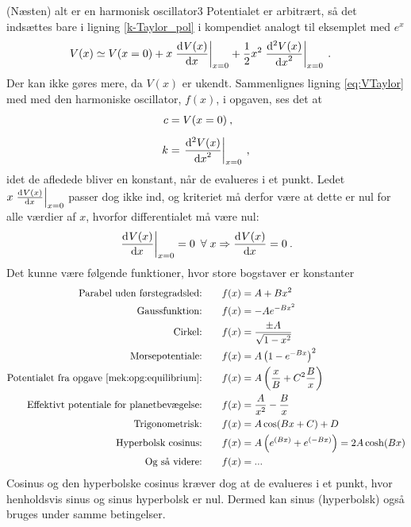 \begin{opgave}{(Næsten) alt er en harmonisk oscillator}{3}
\opg Potentialet er arbitrært, så det indsættes bare i ligning \eqref{k-Taylor_pol} i kompendiet analogt til eksemplet med $e^x$
\begin{align} \label{eq:VTaylor}
	V(x) \simeq V(x=0) &+ x\left.\dif{x}{V(x)}\right|_{x=0} + \frac{1}{2}x^2\left.\dif[2]{x}{V(x)}\right|_{x=0} \: .
\end{align}
Der kan ikke gøres mere, da $V(x)$ er ukendt.
\opg Sammenlignes ligning \eqref{eq:VTaylor} med med den harmoniske oscillator, $f(x)$, i opgaven, ses det at
\begin{align*}
	c &= V(x=0) \: , \\[.5em]
	k &= \left.\dif[2]{x}{V(x)}\right|_{x=0} \: ,
\end{align*}
idet de afledede bliver en konstant, når de evalueres i et punkt. Ledet $x\left.\dif{x}{V(x)}\right|_{x=0}$ passer dog ikke ind, og kriteriet må derfor være at dette er nul for alle værdier af $x$, hvorfor differentialet må være nul:
\begin{align*}
	\left.\dif{x}{V(x)}\right|_{x=0} = 0 \enspace\forall \; x \Rightarrow \dif{x}{V(x)} = 0 \: .
\end{align*}
\opg Det kunne være følgende funktioner, hvor store bogstaver er konstanter
\begingroup
\allowdisplaybreaks
\begin{align*}
	\text{Parabel uden førstegradsled:} \qquad
	&f(x) = A + Bx^2 \\
	\text{Gaussfunktion:} \qquad
	&f(x) = -Ae^{-Bx^2}\\
	\text{Cirkel:} \qquad
	&f(x) = \frac{\pm A}{\sqrt{1-x^2}}\\
	\text{Morsepotentiale:} \qquad
	&f(x) = A\left(1-e^{-Bx}\right)^2\\
	\text{Potentialet fra opgave \ref{mek:opg:equilibrium}:} \qquad
	&f(x) = A\left(\frac{x}{B}+C^2\frac{B}{x}\right)\\
	\text{Effektivt potentiale for planetbevægelse:} \qquad
	&f(x) = \frac{A}{x^2}-\frac{B}{x} \\
	\text{Trigonometrisk:} \qquad
	&f(x) = A\cos(Bx + C) + D \\
	\text{Hyperbolsk cosinus:} \qquad
	&f(x) = A\left(e^{(Bx)} + e^{(-Bx)}\right) = 2A\cosh(Bx) \\
	\text{Og så videre:} \qquad &f(x) = ... 
\end{align*}
\endgroup
Cosinus og den hyperbolske cosinus kræver dog at de evalueres i et punkt, hvor henholdsvis sinus og sinus hyperbolsk er nul. Dermed kan sinus (hyperbolsk) også bruges under samme betingelser.

\end{opgave}
